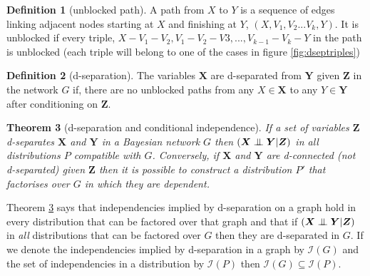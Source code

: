 \documentclass[11pt,a4paper,twoside]{report}
\newcommand{\indep}[1]{\mathcal{I}\left(#1\right)}
\theoremstyle{plain}
\newtheorem{theorem}{Theorem}
\theoremstyle{definition}
\newtheorem{definition}[theorem]{Definition}
\newcommand{\ci}{\mathrel{\perp\mspace{-10mu}\perp}}
\begin{document}
\vspace{.3cm}
\begin{definition}[unblocked path]
\label{def:unblocked}
A path from $X$ to $Y$ is a sequence of edges linking adjacent nodes starting at $X$ and finishing at $Y$,  $(X,V_{1},V_{2}...V_{k},Y)$. It is unblocked if every triple, $X-V_{1}-V_{2},V_{1}-V_{2}-V{3},...,V_{k-1}-V_{k}-Y$ in the path is unblocked (each triple will belong to one of the cases in figure \ref{fig:dseptriples})
\end{definition}

\vspace{.3cm}
\begin{definition}[d-separation]
\label{def:dsep}
The variables $\boldsymbol{X}$ are d-separated from $\boldsymbol{Y}$ given $\boldsymbol{Z}$ in the network $G$ if, there are no unblocked paths from any $X \in \boldsymbol{X}$ to any $Y \in \boldsymbol{Y}$ after conditioning on $\boldsymbol{Z}$. 
\end{definition}

\vspace{.3cm}
\begin{theorem}[d-separation and conditional independence]
\label{thrm:dsep_independence}
If a set of variables $\boldsymbol{Z}$ d-separates $\boldsymbol{X}$ and $\boldsymbol{Y}$ in a Bayesian network $G$ then ${(\boldsymbol{X} \ci \boldsymbol{Y}|\boldsymbol{Z})}$ in all distributions $P$ compatible with $G$. Conversely, if $\boldsymbol{X}$ and $\boldsymbol{Y}$ are d-connected (not d-separated) given $\boldsymbol{Z}$ then it is possible to construct a distribution $P'$ that factorises over $G$ in which they are dependent. 
\end{theorem}

Theorem \ref{thrm:dsep_independence} says that independencies implied by d-separation on a graph hold in every distribution that can be factored over that graph and that if ${(\boldsymbol{X} \ci \boldsymbol{Y}|\boldsymbol{Z})}$ in \emph{all} distributions that can be factored over $G$ then they are d-separated in $G$. If we denote the independencies implied by d-separation in a graph by $\indep{G}$ and the set of independencies in a distribution by $\indep{P}$ then $\indep{G} \subseteq \indep{P}$. 
\end{document}
